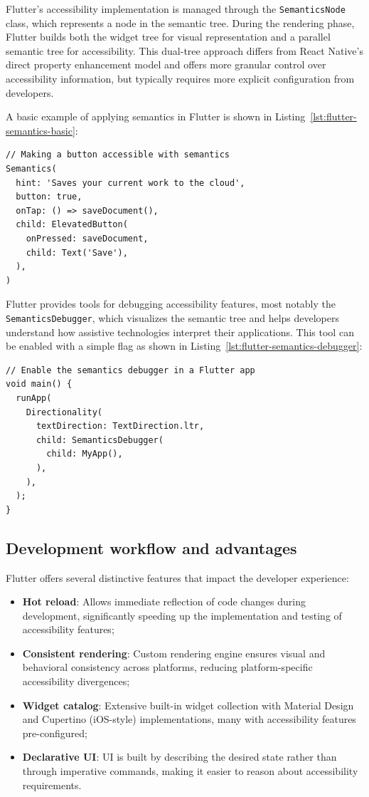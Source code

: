 Flutter's accessibility implementation is managed through the \texttt{SemanticsNode} class, which represents a node in the semantic tree. During the rendering phase, Flutter builds both the widget tree for visual representation and a parallel semantic tree for accessibility. This dual-tree approach differs from React Native's direct property enhancement model and offers more granular control over accessibility information, but typically requires more explicit configuration from developers.

A basic example of applying semantics in Flutter is shown in Listing~\ref{lst:flutter-semantics-basic}:

\begin{lstlisting}[style=DartStyle, caption=Basic Semantics implementation in Flutter, label=lst:flutter-semantics-basic]
// Making a button accessible with semantics
Semantics(
  hint: 'Saves your current work to the cloud',
  button: true,
  onTap: () => saveDocument(),
  child: ElevatedButton(
    onPressed: saveDocument,
    child: Text('Save'),
  ),
)
\end{lstlisting}

Flutter provides tools for debugging accessibility features, most notably the \\\texttt{SemanticsDebugger}, which visualizes the semantic tree and helps developers understand how assistive technologies interpret their applications. This tool can be enabled with a simple flag as shown in Listing~\ref{lst:flutter-semantics-debugger}:

\begin{lstlisting}[style=DartStyle, caption=Using the SemanticsDebugger in Flutter, label=lst:flutter-semantics-debugger]
// Enable the semantics debugger in a Flutter app
void main() {
  runApp(
    Directionality(
      textDirection: TextDirection.ltr,
      child: SemanticsDebugger(
        child: MyApp(),
      ),
    ),
  );
}
\end{lstlisting}

\subsection{Development workflow and advantages}
Flutter offers several distinctive features that impact the developer experience:
\begin{itemize}
    \item \textbf{Hot reload}: Allows immediate reflection of code changes during development, significantly speeding up the implementation and testing of accessibility features;
    \item \textbf{Consistent rendering}: Custom rendering engine ensures visual and behavioral consistency across platforms, reducing platform-specific accessibility divergences;
    \item \textbf{Widget catalog}: Extensive built-in widget collection with Material Design and Cupertino (iOS-style) implementations, many with accessibility features pre-configured;
    \item \textbf{Declarative UI}: UI is built by describing the desired state rather than through imperative commands, making it easier to reason about accessibility requirements.
\end{itemize}

